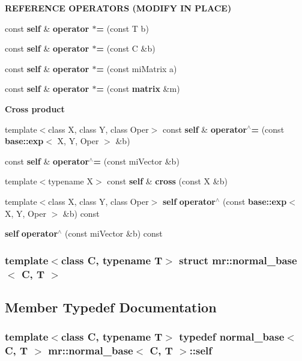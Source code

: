 \begin{Indent}{\bf REFERENCE OPERATORS (MODIFY IN PLACE)}\par
\begin{CompactItemize}
\item 
const {\bf self} \& {\bf operator $\ast$=} (const T b)
\item 
const {\bf self} \& {\bf operator $\ast$=} (const C \&b)
\item 
const {\bf self} \& {\bf operator $\ast$=} (const mi\-Matrix a)
\item 
const {\bf self} \& {\bf operator $\ast$=} (const {\bf matrix} \&m)
\end{CompactItemize}
\end{Indent}
\begin{Indent}{\bf Cross product}\par
\begin{CompactItemize}
\item 
template$<$class X, class Y, class Oper$>$ const {\bf self} \& {\bf operator$^\wedge$=} (const {\bf base::exp}$<$ X, Y, Oper $>$ \&b)
\item 
const {\bf self} \& {\bf operator$^\wedge$=} (const mi\-Vector \&b)
\item 
template$<$typename X$>$ const {\bf self} \& {\bf cross} (const X \&b)
\item 
template$<$class X, class Y, class Oper$>$ {\bf self} {\bf operator$^\wedge$} (const {\bf base::exp}$<$ X, Y, Oper $>$ \&b) const 
\item 
{\bf self} {\bf operator$^\wedge$} (const mi\-Vector \&b) const 
\end{CompactItemize}
\end{Indent}
\subsubsection*{template$<$class C, typename T$>$ struct mr::normal\_\-base$<$ C, T $>$}



\subsection{Member Typedef Documentation}
\subsubsection{\setlength{\rightskip}{0pt plus 5cm}template$<$class C, typename T$>$ typedef {\bf normal\_\-base}$<$ C, T $>$ {\bf mr::normal\_\-base}$<$ C, T $>$::{\bf self}}\label{structmr_1_1normal__base_w0}




